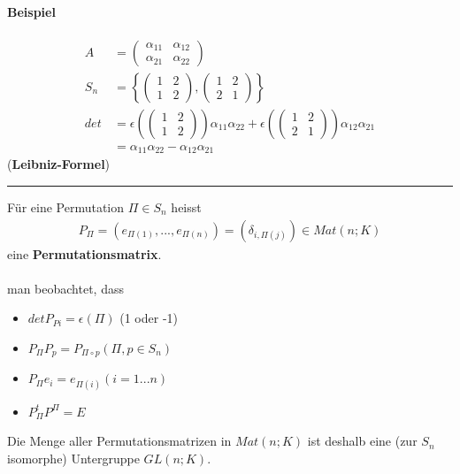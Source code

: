 \documentclass[11pt]{report}
\newcommand*\f[1] {\textbf{#1}}
\begin{document}
\paragraph{Beispiel}
\begin{align}
A &= \begin{pmatrix}\alpha_{11}& \alpha_{12} \\ \alpha_{21} & \alpha_{22} \end{pmatrix} \\
S_n &= \left\{ \begin{pmatrix}1 & 2 \\ 1 & 2\end{pmatrix}, \begin{pmatrix}1 & 2 \\ 2 & 1\end{pmatrix}\right\} \\
det \, &= \epsilon \left( \begin{pmatrix}1 & 2 \\ 1 & 2\end{pmatrix} \right) \alpha_{11} \alpha_{22} + \epsilon \left( \begin{pmatrix}1 & 2 \\ 2 & 1\end{pmatrix} \right) \alpha_{12} \alpha_{21} \\
&= \alpha_{11} \alpha_{22} - \alpha_{12} \alpha_{21}
\end{align}
(\f{Leibniz-Formel}) \\
\vspace*{0.2cm}\rule{\linewidth}{0.3mm}\vspace{0.2cm}
Für eine Permutation $\Pi \in S_n$ heisst
\begin{align}
P_{\Pi} = (e_{\Pi(1)}, ..., e_{\Pi(n)}) = (\delta_{i, \Pi(j)}) \in Mat(n;K)
\end{align}
eine \f{Permutationsmatrix}. \\\\
man beobachtet, dass
\begin{itemize}
\item $det P_{Pi} = \epsilon(\Pi)$ (1 oder -1)
\item $P_{\Pi} P_p = P_{\Pi \circ p} (\Pi, p \in S_n)$
\item $P_{\Pi} e_i = e_{\Pi(i)} (i = 1...n)$
\item $P_{\Pi}^{t} P^{\Pi} = E$
\end{itemize}
Die Menge aller Permutationsmatrizen in $Mat(n;K)$ ist deshalb eine (zur $S_n$ isomorphe) Untergruppe $GL(n;K)$.
\end{document}
